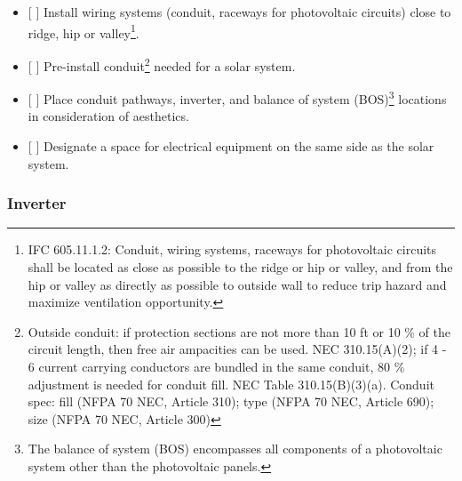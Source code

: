 \documentclass[]{article}
\providecommand{\tightlist}{%
  \setlength{\itemsep}{0pt}\setlength{\parskip}{0pt}}
\let\rmarkdownfootnote\footnote%
\def\footnote{\protect\rmarkdownfootnote}
\begin{document}
\begin{itemize}
\tightlist
\item
  {[} {]} Install wiring systems (conduit, raceways for photovoltaic
  circuits) close to ridge, hip or valley\footnote{IFC 605.11.1.2:
    Conduit, wiring systems, raceways for photovoltaic circuits shall be
    located as close as possible to the ridge or hip or valley, and from
    the hip or valley as directly as possible to outside wall to reduce
    trip hazard and maximize ventilation opportunity.}.
\item
  {[} {]} Pre-install conduit\footnote{Outside conduit: if protection
    sections are not more than 10 ft or 10 \% of the circuit length,
    then free air ampacities can be used. NEC 310.15(A)(2); if 4 - 6
    current carrying conductors are bundled in the same conduit, 80 \%
    adjustment is needed for conduit fill. NEC Table 310.15(B)(3)(a).
    Conduit spec: fill (NFPA 70 NEC, Article 310); type (NFPA 70 NEC,
    Article 690); size (NFPA 70 NEC, Article 300)} needed for a solar
  system.
\item
  {[} {]} Place conduit pathways, inverter, and balance of system
  (BOS)\footnote{The balance of system (BOS) encompasses all components
    of a photovoltaic system other than the photovoltaic panels.}
  locations in consideration of aesthetics.
\item
  {[} {]} Designate a space for electrical equipment on the same side as
  the solar system.
\end{itemize}

\hypertarget{inverter}{%
\subsubsection{Inverter}\label{inverter}}
\end{document}
